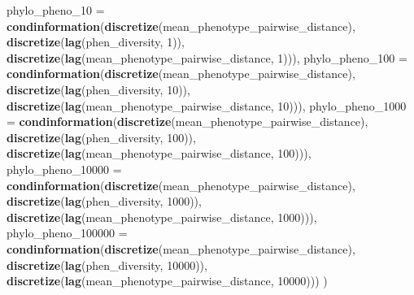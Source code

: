 \documentclass[]{book}
\newenvironment{Shaded}{\begin{snugshade}}{\end{snugshade}}
\newcommand{\DataTypeTok}[1]{\textcolor[rgb]{0.13,0.29,0.53}{#1}}
\newcommand{\DecValTok}[1]{\textcolor[rgb]{0.00,0.00,0.81}{#1}}
\newcommand{\KeywordTok}[1]{\textcolor[rgb]{0.13,0.29,0.53}{\textbf{#1}}}
\newcommand{\NormalTok}[1]{#1}
\begin{document}
\begin{Shaded}
\begin{Highlighting}[]
{  \DataTypeTok{phylo_pheno_10 =}     \KeywordTok{condinformation}\NormalTok{(}\KeywordTok{discretize}\NormalTok{(mean_phenotype_pairwise_distance),}
                                       \KeywordTok{discretize}\NormalTok{(}\KeywordTok{lag}\NormalTok{(phen_diversity, }\DecValTok{1}\NormalTok{)),}
                                       \KeywordTok{discretize}\NormalTok{(}\KeywordTok{lag}\NormalTok{(mean_phenotype_pairwise_distance, }\DecValTok{1}\NormalTok{))),}
  \DataTypeTok{phylo_pheno_100 =}    \KeywordTok{condinformation}\NormalTok{(}\KeywordTok{discretize}\NormalTok{(mean_phenotype_pairwise_distance),}
                                       \KeywordTok{discretize}\NormalTok{(}\KeywordTok{lag}\NormalTok{(phen_diversity, }\DecValTok{10}\NormalTok{)),}
                                       \KeywordTok{discretize}\NormalTok{(}\KeywordTok{lag}\NormalTok{(mean_phenotype_pairwise_distance, }\DecValTok{10}\NormalTok{))),}
  \DataTypeTok{phylo_pheno_1000 =}   \KeywordTok{condinformation}\NormalTok{(}\KeywordTok{discretize}\NormalTok{(mean_phenotype_pairwise_distance),}
                                       \KeywordTok{discretize}\NormalTok{(}\KeywordTok{lag}\NormalTok{(phen_diversity, }\DecValTok{100}\NormalTok{)),}
                                       \KeywordTok{discretize}\NormalTok{(}\KeywordTok{lag}\NormalTok{(mean_phenotype_pairwise_distance, }\DecValTok{100}\NormalTok{))),}
  \DataTypeTok{phylo_pheno_10000 =}  \KeywordTok{condinformation}\NormalTok{(}\KeywordTok{discretize}\NormalTok{(mean_phenotype_pairwise_distance),}
                                       \KeywordTok{discretize}\NormalTok{(}\KeywordTok{lag}\NormalTok{(phen_diversity, }\DecValTok{1000}\NormalTok{)),}
                                       \KeywordTok{discretize}\NormalTok{(}\KeywordTok{lag}\NormalTok{(mean_phenotype_pairwise_distance, }\DecValTok{1000}\NormalTok{))),}
  \DataTypeTok{phylo_pheno_100000 =} \KeywordTok{condinformation}\NormalTok{(}\KeywordTok{discretize}\NormalTok{(mean_phenotype_pairwise_distance),}
                                       \KeywordTok{discretize}\NormalTok{(}\KeywordTok{lag}\NormalTok{(phen_diversity, }\DecValTok{10000}\NormalTok{)),}
                                       \KeywordTok{discretize}\NormalTok{(}\KeywordTok{lag}\NormalTok{(mean_phenotype_pairwise_distance, }\DecValTok{10000}\NormalTok{)))}
\NormalTok{)}

}
\end{Highlighting}
\end{Shaded}
\end{document}

